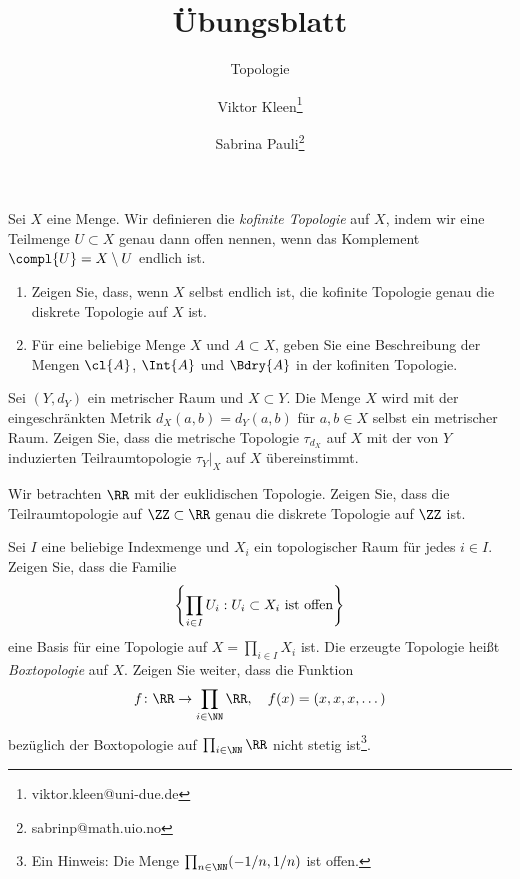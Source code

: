 

\setcounter{Sheet}{2}

\title{Übungsblatt \theSheet}
\subtitle{Topologie}
\author{Viktor Kleen\footnote{viktor.kleen@uni-due.de} \and Sabrina Pauli\footnote{sabrinp@math.uio.no}}
\date{}


\maketitle
\begin{exercise}
Sei $X$ eine Menge. Wir definieren die \emph{kofinite Topologie} auf $X$,
indem wir eine Teilmenge $U\subset X$ genau dann offen nennen, wenn das
Komplement $\compl{U} = X\setminus U$ endlich ist.
\begin{enumerate}
\item Zeigen Sie, dass, wenn $X$ selbst endlich ist, die kofinite
    Topologie genau die diskrete Topologie auf $X$ ist.
\item Für eine beliebige Menge $X$ und $A\subset X$, geben Sie eine
    Beschreibung der Mengen $\cl{A}$, $\Int{A}$ und $\Bdry{A}$ in der kofiniten
    Topologie.
\end{enumerate}
\end{exercise}

\begin{exercise}
Sei $(Y,d_Y)$ ein metrischer Raum und $X\subset Y$. Die Menge $X$ wird mit
der eingeschränkten Metrik $d_X(a,b) = d_Y(a,b)$ für $a,b\in X$ selbst
ein metrischer Raum. Zeigen Sie, dass die metrische Topologie $\tau_{d_X}$
auf $X$ mit der von $Y$ induzierten Teilraumtopologie $\tau_Y|_X$ auf $X$
übereinstimmt.
\end{exercise}

\begin{exercise}
Wir betrachten $\RR$ mit der euklidischen Topologie. Zeigen Sie, dass die
Teilraumtopologie auf $\ZZ\subset\RR$ genau die diskrete Topologie auf
$\ZZ$ ist.
\end{exercise}

\begin{exercise}
Sei $I$ eine beliebige Indexmenge und $X_i$ ein topologischer Raum für
jedes $i\in I$. Zeigen Sie, dass die Familie
\[
\left\{ \prod_{i\in I} U_i : \textnormal{$U_i\subset X_i$ ist offen} \right\}
\]
eine Basis für eine Topologie auf $X = \prod_{i\in I} X_i$ ist. Die erzeugte
Topologie heißt \emph{Boxtopologie} auf $X$. Zeigen Sie weiter, dass die
Funktion
\[
f\colon \RR \to \prod_{i\in\NN} \RR,\quad f(x) = (x,x,x,\dots)
\]
bezüglich der Boxtopologie auf $\prod_{i\in\NN}\RR$ nicht stetig
ist\footnote{Ein Hinweis: Die Menge $\prod_{n\in\NN} (-1/n, 1/n)$ ist offen.}.
\end{exercise}


